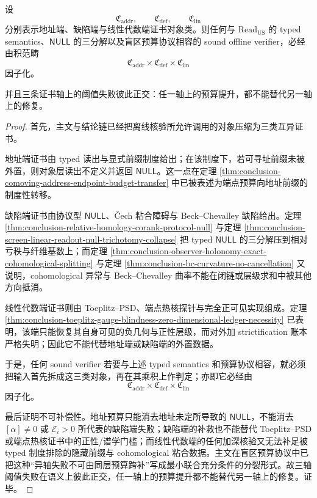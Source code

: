 \begin{proposition}[三端证书语义的正交分裂与不可补偿性]\label{prop:conclusion-three-end-certificate-orthogonality}
设
\[
\mathfrak C_{\mathrm{addr}},\qquad
\mathfrak C_{\mathrm{def}},\qquad
\mathfrak C_{\mathrm{lin}}
\]
分别表示地址端、缺陷端与线性代数端证书对象类。则任何与 \(\mathrm{Read}_{\mathrm{US}}\) 的 typed semantics、\(\mathsf{NULL}\) 的三分解以及盲区预算协议相容的 sound offline verifier，必经由积范畴
\[
\mathfrak C_{\mathrm{addr}}\times \mathfrak C_{\mathrm{def}}\times \mathfrak C_{\mathrm{lin}}
\]
因子化。

并且三条证书轴上的阈值失败彼此正交：任一轴上的预算提升，都不能替代另一轴上的修复。
\end{proposition}
\begin{proof}
首先，主文与结论链已经把离线核验所允许调用的对象压缩为三类互异证书。

地址端证书由 typed 读出与显式前缀制度给出；在该制度下，若可寻址前缀未被外置，则对象层读出不定义并返回 \(\mathsf{NULL}\)。这一点在定理 \ref{thm:conclusion-comoving-address-endpoint-budget-transfer} 中已被表述为端点预算向地址前缀的制度性转移。

缺陷端证书由协议型 \(\mathsf{NULL}\)、Čech 粘合障碍与 Beck--Chevalley 缺陷给出。定理 \ref{thm:conclusion-relative-homology-corank-protocol-null} 与定理 \ref{thm:conclusion-screen-linear-readout-null-trichotomy-collapse} 把 typed \(\mathsf{NULL}\) 的三分解压到相对亏秩与纤维基数上；而定理 \ref{thm:conclusion-observer-holonomy-exact-cohomological-splitting} 与定理 \ref{thm:conclusion-bc-curvature-no-cancellation} 又说明，cohomological 异常与 Beck--Chevalley 曲率不能在闭链或层级求和中被其他方向抵消。

线性代数端证书则由 Toeplitz--PSD、端点热核探针与完全正可见实现组成。定理 \ref{thm:conclusion-toeplitz-gauge-blindness-zero-dimensional-ledger-necessity} 已表明，该端只能恢复其自身可见的负几何与正性层级，而对外加 strictification 账本严格失明；因此它不能代替地址端或缺陷端的外置数据。

于是，任何 sound verifier 若要与上述 typed semantics 和预算协议相容，就必须把输入首先拆成这三类对象，再在其乘积上作判定；亦即它必经由
\[
\mathfrak C_{\mathrm{addr}}\times \mathfrak C_{\mathrm{def}}\times \mathfrak C_{\mathrm{lin}}
\]
因子化。

最后证明不可补偿性。地址预算只能消去地址未定所导致的 \(\mathsf{NULL}\)，不能消去 \([\alpha]\neq 0\) 或 \( \mathcal E_i>0\) 所代表的缺陷端失败；缺陷端的补救也不能替代 Toeplitz--PSD 或端点热核证书中的正性/谱学门槛；而线性代数端的任何加深核验又无法补足被 typed 制度排除的隐藏前缀与 cohomological 粘合数据。主文在盲区预算协议中已把这种“异轴失败不可由同层预算跨补”写成最小联合充分条件的分裂形式。故三轴阈值失败在语义上彼此正交，任一轴上的预算提升都不能替代另一轴上的修复。证毕。
\end{proof}

